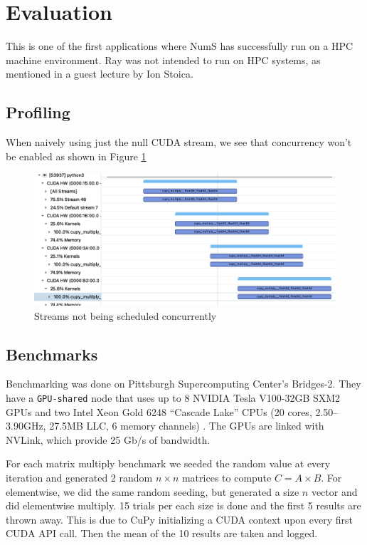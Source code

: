 \documentclass{article}
\begin{document}
\section{Evaluation}
This is one of the first applications where NumS has successfully run on a HPC machine environment. Ray was not intended to run on HPC systems, as mentioned in a guest lecture by Ion Stoica. \cite{ray-lecture} 

\subsection{Profiling}
When naively using just the null CUDA stream, we see that concurrency won't be enabled as shown in Figure \ref{fig:stream} 

\begin{figure}
  \centerline{\includegraphics[width=6in]{figures/stream.png}}
  \caption{Streams not being scheduled concurrently}
  \label{fig:stream}
\end{figure}

\subsection{Benchmarks}
Benchmarking was done on Pittsburgh Supercomputing Center's Bridges-2. They have a \verb|GPU-shared| node that uses up to 8 NVIDIA Tesla V100-32GB SXM2 GPUs and two Intel Xeon Gold 6248 “Cascade Lake” CPUs (20 cores, 2.50–3.90GHz, 27.5MB LLC, 6 memory channels) \cite{psc}. The GPUs are linked with NVLink, which provide 25 Gb/s of bandwidth.


For each matrix multiply benchmark we seeded the random value at every iteration and generated 2 random $n \times n$ matrices to compute $C =  A \times B$. For elementwise, we did the same random seeding, but generated a size $n$ vector and did elementwise multiply. 15 trials per each size is done and the first 5 results are thrown away. This is due to CuPy initializing a CUDA context upon every first CUDA API call. Then the mean of the 10 results are taken and logged.
\end{document}
